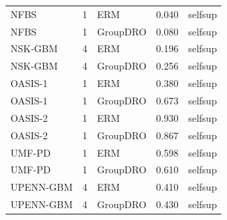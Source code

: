 \begin{tabular}{lrlrl}
NFBS & 1 & ERM & 0.040 & selfsup \\
NFBS & 1 & GroupDRO & 0.080 & selfsup \\
NSK-GBM & 4 & ERM & 0.196 & selfsup \\
NSK-GBM & 4 & GroupDRO & 0.256 & selfsup \\
OASIS-1 & 1 & ERM & 0.380 & selfsup \\
OASIS-1 & 1 & GroupDRO & 0.673 & selfsup \\
OASIS-2 & 1 & ERM & 0.930 & selfsup \\
OASIS-2 & 1 & GroupDRO & 0.867 & selfsup \\
UMF-PD & 1 & ERM & 0.598 & selfsup \\
UMF-PD & 1 & GroupDRO & 0.610 & selfsup \\
UPENN-GBM & 4 & ERM & 0.410 & selfsup \\
UPENN-GBM & 4 & GroupDRO & 0.430 & selfsup \\
\bottomrule
\end{tabular}
